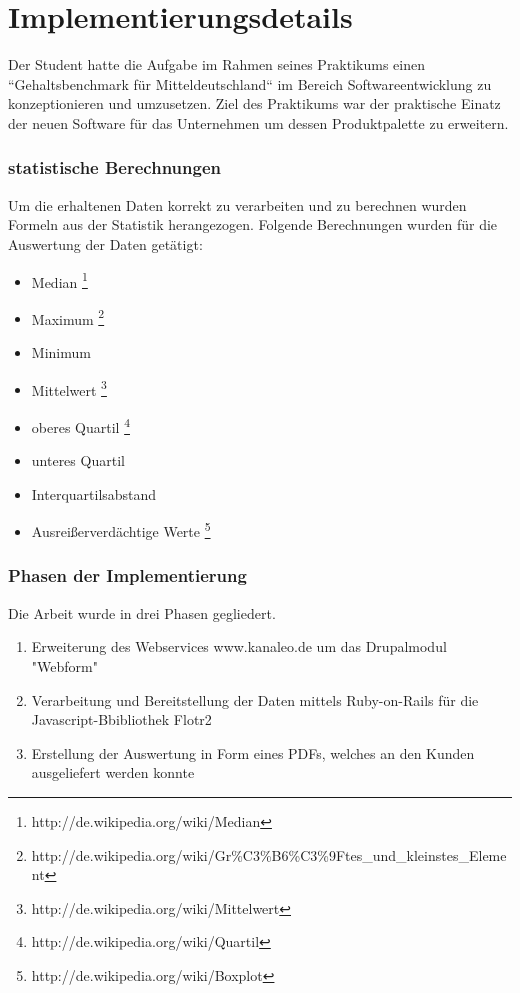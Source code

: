\part{Implementierungsdetails}
Der Student hatte die Aufgabe im Rahmen seines Praktikums einen
``Gehaltsbenchmark für Mitteldeutschland`` im Bereich  Softwareentwicklung zu
konzeptionieren und umzusetzen. Ziel des Praktikums war der praktische Einatz
der neuen Software für das Unternehmen um dessen Produktpalette zu erweitern.
\section{statistische Berechnungen}
\label{sec:stat}
Um die erhaltenen Daten korrekt zu verarbeiten und zu berechnen wurden Formeln
aus der Statistik herangezogen. Folgende Berechnungen wurden für die Auswertung
der Daten getätigt:
\begin{itemize}
  \item Median \footnote{http://de.wikipedia.org/wiki/Median}
  \item Maximum \footnote{http://de.wikipedia.org/wiki/Gr\%C3\%B6\%C3\%9Ftes\_und\_kleinstes\_Element}
  \item Minimum \footnotemark[9]
  \item Mittelwert \footnote{http://de.wikipedia.org/wiki/Mittelwert}
  \item oberes Quartil \footnote{http://de.wikipedia.org/wiki/Quartil}
  \item unteres Quartil \footnotemark[11]
  \item Interquartilsabstand \footnotemark[11]
  \item Ausreißerverdächtige Werte \footnote{http://de.wikipedia.org/wiki/Boxplot}
\end{itemize}
\section{Phasen der Implementierung}
Die Arbeit wurde in drei Phasen gegliedert. 
\begin{enumerate}
  \item Erweiterung des Webservices www.kanaleo.de um das Drupalmodul "Webform" 
  \item Verarbeitung und Bereitstellung der Daten mittels Ruby-on-Rails für die
Javascript-Bbibliothek Flotr2 
  \item Erstellung der Auswertung in Form eines PDFs, welches an den Kunden
ausgeliefert werden konnte
\end{enumerate}
